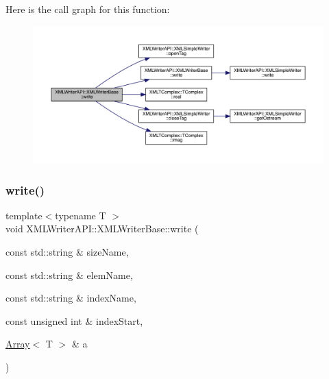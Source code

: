 Here is the call graph for this function\+:
\nopagebreak
\begin{figure}[H]
\begin{center}
\leavevmode
\includegraphics[width=350pt]{d5/df5/classXMLWriterAPI_1_1XMLWriterBase_a00b5edcaf39f8bdaf2aa5eed7118c8e7_cgraph}
\end{center}
\end{figure}
\mbox{\label{classXMLWriterAPI_1_1XMLWriterBase_a85d9236f5ec6ccc3c8559d4ec431bf6b}} 
\subsubsection{\texorpdfstring{write()}{write()}\hspace{0.1cm}{\footnotesize\ttfamily [23/26]}}
{\footnotesize\ttfamily template$<$typename T $>$ \\
void X\+M\+L\+Writer\+A\+P\+I\+::\+X\+M\+L\+Writer\+Base\+::write (\begin{DoxyParamCaption}\item[{const std\+::string \&}]{size\+Name,  }\item[{const std\+::string \&}]{elem\+Name,  }\item[{const std\+::string \&}]{index\+Name,  }\item[{const unsigned int \&}]{index\+Start,  }\item[{\mbox{\hyperlink{classXMLArray_1_1Array}{Array}}$<$ T $>$ \&}]{a }\end{DoxyParamCaption})\hspace{0.3cm}{\ttfamily [inline]}}

